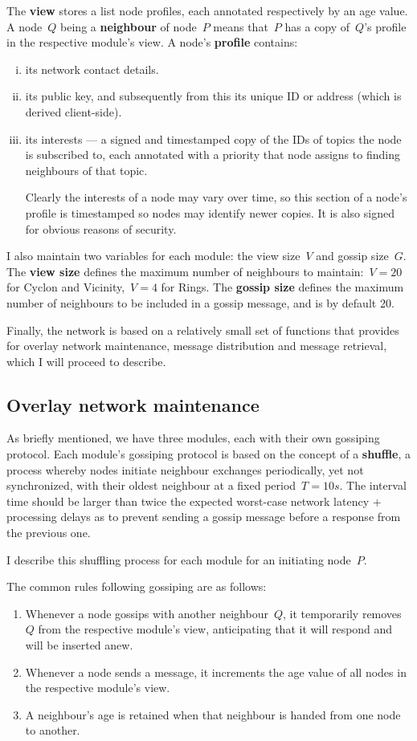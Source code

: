 \documentclass[10pt,a4paper,onecolumn]{article}
\begin{document}
The \textbf{view} stores a list node profiles, each annotated respectively by an age value. A node~$Q$ being a \textbf{neighbour} of node~$P$ means that~$P$ has a copy of~$Q$'s profile in the respective module's view. A node's \textbf{profile} contains:
\begin{enumerate}[i.]
\item its network contact details.
\item its public key, and subsequently from this its unique ID or address (which is derived client-side).
\item its interests — a signed and timestamped copy of the IDs of topics the node is subscribed to, each annotated with a priority that node assigns to finding neighbours of that topic. 

Clearly the interests of a node may vary over time, so this section of a node's profile is timestamped so nodes may identify newer copies. It is also signed for obvious reasons of security.
\end{enumerate}

I also maintain two variables for each module: the view size~$V$ and gossip size~$G$. The \textbf{view size} defines the maximum number of neighbours to maintain:~$V = 20$ for Cyclon and Vicinity,~$V = 4$ for Rings. The \textbf{gossip size} defines the maximum number of neighbours to be included in a gossip message, and is by default 20.

Finally, the network is based on a relatively small set of functions that provides for overlay network maintenance, message distribution and message retrieval, which I will proceed to describe.

\subsection{Overlay network maintenance}
As briefly mentioned, we have three modules, each with their own gossiping protocol. Each module's gossiping protocol is based on the concept of a \textbf{shuffle}, a process whereby nodes initiate neighbour exchanges periodically, yet not synchronized, with their oldest neighbour at a fixed period~$T = 10s$. The interval time should be larger than twice the expected worst-case network latency + processing delays as to prevent sending a gossip message before a response from the previous one. 

I describe this shuffling process for each module for an initiating node~$P$.

The common rules following gossiping are as follows:
\begin{enumerate}
\item Whenever a node gossips with another neighbour~$Q$, it temporarily removes~$Q$ from the respective module’s view, anticipating that it will respond and will be inserted anew. 
\item Whenever a node sends a message, it increments the age value of all nodes in the respective module's view.
\item A neighbour's age is retained when that neighbour is handed from one node to another.
\end{enumerate}
\end{document}
